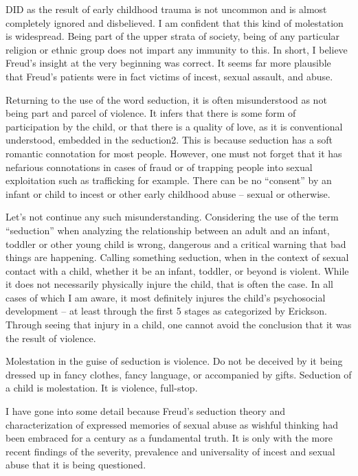\documentclass[]{book}
\begin{document}
DID as the result of early childhood trauma is not uncommon and is almost completely ignored and disbelieved. I am confident that this kind of molestation is widespread. Being part of the upper strata of society, being of any particular religion or ethnic group does not impart any immunity to this. In short, I believe Freud's insight at the very beginning was correct. It seems far more plausible that Freud's patients were in fact victims of incest, sexual assault, and abuse.

Returning to the use of the word seduction, it is often misunderstood as not being part and parcel of violence. It infers that there is some form of participation by the child, or that there is a quality of love, as it is conventional understood, embedded in the seduction2. This is because seduction has a soft romantic connotation for most people. However, one must not forget that it has nefarious connotations in cases of fraud or of trapping people into sexual exploitation such as trafficking for example. There can be no ``consent'' by an infant or child to incest or other early childhood abuse -- sexual or otherwise.

Let's not continue any such misunderstanding. Considering the use of the term ``seduction'' when analyzing the relationship between an adult and an infant, toddler or other young child is wrong, dangerous and a critical warning that bad things are happening. Calling something seduction, when in the context of sexual contact with a child, whether it be an infant, toddler, or beyond is violent. While it does not necessarily physically injure the child, that is often the case. In all cases of which I am aware, it most definitely injures the child's psychosocial development -- at least through the first 5 stages as categorized by Erickson. Through seeing that injury in a child, one cannot avoid the conclusion that it was the result of violence.

Molestation in the guise of seduction is violence. Do not be deceived by it being dressed up in fancy clothes, fancy language, or accompanied by gifts. Seduction of a child is molestation. It is violence, full-stop.

I have gone into some detail because Freud's seduction theory and characterization of expressed memories of sexual abuse as wishful thinking had been embraced for a century as a fundamental truth. It is only with the more recent findings of the severity, prevalence and universality of incest and sexual abuse that it is being questioned.
\end{document}

